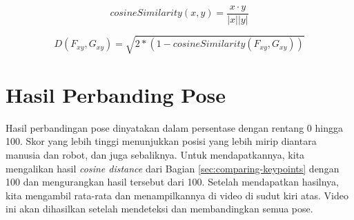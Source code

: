 \begin{equation}
  \label{eq:cosinesimilarity}
  cosineSimilarity(x,y) = \frac{x \cdot y}{|x||y|}
\end{equation}

\begin{equation}
  \label{eq:euclideandistance}
  D(F_{xy}, G_{xy}) = \sqrt{2 * (1 - cosineSimilarity(F_{xy}, G_{xy}))}
\end{equation}


\section{Hasil Perbanding Pose}
\label{sec:pose-similarity-result}

Hasil perbandingan pose dinyatakan dalam persentase dengan rentang 0 hingga 100. Skor yang lebih tinggi menunjukkan posisi yang lebih mirip diantara manusia dan robot, dan juga sebaliknya.
Untuk mendapatkannya, kita mengalikan hasil \textit{cosine distance} dari Bagian \ref{sec:comparing-keypoints} dengan 100 dan mengurangkan hasil tersebut dari 100.
Setelah mendapatkan hasilnya, kita mengambil rata-rata dan menampilkannya di video di sudut kiri atas. Video ini akan dihasilkan setelah mendeteksi dan membandingkan semua pose.